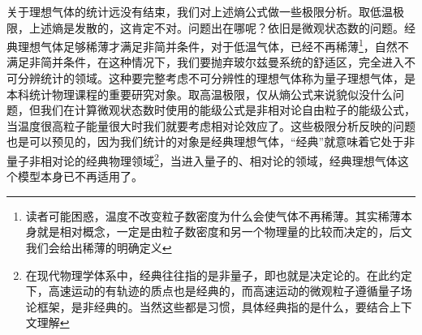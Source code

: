 \documentclass[../../main.tex]{subfiles}
\begin{document}
关于理想气体的统计远没有结束，我们对上述熵公式做一些极限分析。取低温极限，上述熵是发散的，这肯定不对。问题出在哪呢？依旧是微观状态数的问题。经典理想气体足够稀薄才满足非简并条件，对于低温气体，已经不再稀薄\footnote{读者可能困惑，温度不改变粒子数密度为什么会使气体不再稀薄。其实稀薄本身就是相对概念，一定是由粒子数密度和另一个物理量的比较而决定的，后文我们会给出稀薄的明确定义}，自然不满足非简并条件，在这种情况下，我们要抛弃玻尔兹曼系统的舒适区，完全进入不可分辨统计的领域。这种要完整考虑不可分辨性的理想气体称为量子理想气体，是本科统计物理课程的重要研究对象。取高温极限，仅从熵公式来说貌似没什么问题，但我们在计算微观状态数时使用的能级公式是非相对论自由粒子的能级公式，当温度很高粒子能量很大时我们就要考虑相对论效应了。这些极限分析反映的问题也是可以预见的，因为我们统计的对象是经典理想气体，“经典”就意味着它处于非量子非相对论的经典物理领域\footnote{在现代物理学体系中，经典往往指的是非量子，即也就是决定论的。在此约定下，高速运动的有轨迹的质点也是经典的，而高速运动的微观粒子遵循量子场论框架，是非经典的。当然这些都是习惯，具体经典指的是什么，要结合上下文理解}，当进入量子的、相对论的领域，经典理想气体这个模型本身已不再适用了。
\end{document}
